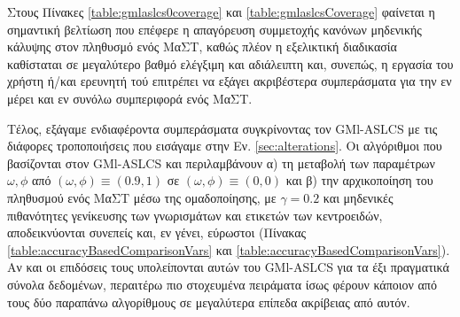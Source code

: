 Στους Πίνακες \ref{table:gmlaslcs0coverage} και \ref{table:gmlaslcsCoverage} φαίνεται η σημαντική βελτίωση που επέφερε η απαγόρευση συμμετοχής κανόνων μηδενικής κάλυψης στον πληθυσμό ενός ΜαΣΤ, καθώς πλέον η εξελικτική διαδικασία καθίσταται σε μεγαλύτερο βαθμό ελέγξιμη και αδιάλειπτη και, συνεπώς, η εργασία του χρήστη ή/και ερευνητή τού επιτρέπει να εξάγει ακριβέστερα συμπεράσματα για την εν μέρει και εν συνόλω συμπεριφορά ενός ΜαΣΤ.

Τέλος, εξάγαμε ενδιαφέροντα συμπεράσματα συγκρίνοντας τον GMl-ASLCS με τις διάφορες τροποποιήσεις που εισάγαμε στην Εν. \ref{sec:alterations}. Οι αλγόριθμοι που βασίζονται στον GMl-ASLCS και περιλαμβάνουν α) τη μεταβολή των παραμέτρων $\omega, \phi$ από $(\omega, \phi) \equiv (0.9, 1)$ σε $(\omega, \phi) \equiv (0, 0)$ και β) την αρχικοποίηση του πληθυσμού ενός ΜαΣΤ μέσω της ομαδοποίησης, με $\gamma=0.2$ και μηδενικές πιθανότητες γενίκευσης των γνωρισμάτων και ετικετών των κεντροειδών, αποδεικνύονται συνεπείς και, εν γένει, εύρωστοι (Πίνακας \ref{table:accuracyBasedComparisonVars} και \ref{table:accuracyBasedComparisonVars}). Αν και οι επιδόσεις τους υπολείπονται αυτών του GMl-ASLCS για τα έξι πραγματικά σύνολα δεδομένων, περαιτέρω  πιο στοχευμένα πειράματα ίσως φέρουν κάποιον από τους δύο παραπάνω αλγορίθμους σε μεγαλύτερα επίπεδα ακρίβειας από αυτόν.




